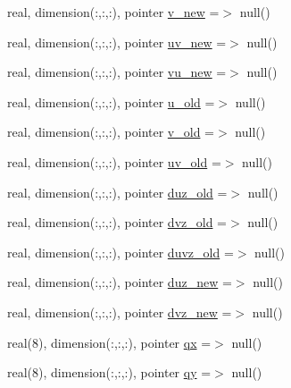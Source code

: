 \begin{DoxyCompactItemize}
real, dimension(\+:,\+:,\+:), pointer \mbox{\hyperlink{structmodulehydrodynamic_1_1t__submodel_abf89cc1c03dd073c6d33a9bbbf2b713f}{v\+\_\+new}} =$>$ null()
\item 
real, dimension(\+:,\+:,\+:), pointer \mbox{\hyperlink{structmodulehydrodynamic_1_1t__submodel_aeb3c31506f5f5277d8d82156de3a8d65}{uv\+\_\+new}} =$>$ null()
\item 
real, dimension(\+:,\+:,\+:), pointer \mbox{\hyperlink{structmodulehydrodynamic_1_1t__submodel_a46384aea0f2b8adabc98dc95f47b7aba}{vu\+\_\+new}} =$>$ null()
\item 
real, dimension(\+:,\+:,\+:), pointer \mbox{\hyperlink{structmodulehydrodynamic_1_1t__submodel_ab42791a2d80dfc244cce80ee4faaadf7}{u\+\_\+old}} =$>$ null()
\item 
real, dimension(\+:,\+:,\+:), pointer \mbox{\hyperlink{structmodulehydrodynamic_1_1t__submodel_a0c779df5d6a93690861aecdbdb960c17}{v\+\_\+old}} =$>$ null()
\item 
real, dimension(\+:,\+:,\+:), pointer \mbox{\hyperlink{structmodulehydrodynamic_1_1t__submodel_a75161e07d7422428c5cfb6662b143453}{uv\+\_\+old}} =$>$ null()
\item 
real, dimension(\+:,\+:,\+:), pointer \mbox{\hyperlink{structmodulehydrodynamic_1_1t__submodel_a7b15f8f36a58b046aa3c53c715f53d6e}{duz\+\_\+old}} =$>$ null()
\item 
real, dimension(\+:,\+:,\+:), pointer \mbox{\hyperlink{structmodulehydrodynamic_1_1t__submodel_aa516ab3cc6912fe92823e0f7c855675d}{dvz\+\_\+old}} =$>$ null()
\item 
real, dimension(\+:,\+:,\+:), pointer \mbox{\hyperlink{structmodulehydrodynamic_1_1t__submodel_a07864253abadb4f3f3f972c11e013fab}{duvz\+\_\+old}} =$>$ null()
\item 
real, dimension(\+:,\+:,\+:), pointer \mbox{\hyperlink{structmodulehydrodynamic_1_1t__submodel_a56d1569a43780ebbe08c752d4e6e73a2}{duz\+\_\+new}} =$>$ null()
\item 
real, dimension(\+:,\+:,\+:), pointer \mbox{\hyperlink{structmodulehydrodynamic_1_1t__submodel_accd9c61f1b43e6d92d7dd22f532c52bb}{dvz\+\_\+new}} =$>$ null()
\item 
real(8), dimension(\+:,\+:,\+:), pointer \mbox{\hyperlink{structmodulehydrodynamic_1_1t__submodel_ae0dfb7daea3a43b8e75041c37b31104e}{qx}} =$>$ null()
\item 
real(8), dimension(\+:,\+:,\+:), pointer \mbox{\hyperlink{structmodulehydrodynamic_1_1t__submodel_a5abeb2bb62c7bed14a78f48fc862be20}{qy}} =$>$ null()
\item 

\end{DoxyCompactItemize}
